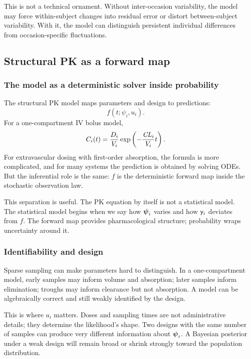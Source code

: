 This is not a technical ornament.  Without inter-occasion variability, the model may force within-subject changes into residual error or distort between-subject variability.  With it, the model can distinguish persistent individual differences from occasion-specific fluctuations.

\subsection{Structural PK as a forward map}

\subsubsection*{The model as a deterministic solver inside probability}

The structural PK model maps parameters and design to predictions:
\[
  f(t;\psi_i,u_i).
\]
For a one-compartment IV bolus model,
\[
  C_i(t)=\frac{D_i}{V_i}\exp\left(-\frac{\pksym{CL}_i}{V_i}t\right).
\]
For extravascular dosing with first-order absorption, the formula is more complicated, and for many systems the prediction is obtained by solving ODEs.  But the inferential role is the same: \(f\) is the deterministic forward map inside the stochastic observation law.

This separation is useful.  The PK equation by itself is not a statistical model.  The statistical model begins when we say how \(\boldsymbol{\psi}_i\) varies and how \(\mathsf{y}_i\) deviates from \(f\).  The forward map provides pharmacological structure; probability wraps uncertainty around it.

\subsubsection*{Identifiability and design}

Sparse sampling can make parameters hard to distinguish.  In a one-compartment model, early samples may inform volume and absorption; later samples inform elimination; troughs may inform clearance but not absorption.  A model can be algebraically correct and still weakly identified by the design.

This is where \(u_i\) matters.  Doses and sampling times are not administrative details; they determine the likelihood's shape.  Two designs with the same number of samples can produce very different information about \(\boldsymbol{\psi}_i\).  A Bayesian posterior under a weak design will remain broad or shrink strongly toward the population distribution.

